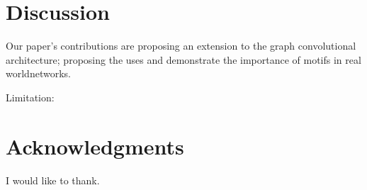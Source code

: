 \documentclass{article}
\theoremstyle{definition}
\begin{document}
\section{Discussion}

Our paper's contributions are proposing an extension to the graph convolutional 
architecture; proposing the uses and demonstrate the importance of motifs in
real worldnetworks.

Limitation: 


\section*{Acknowledgments}

I would like to thank.



\end{document}
